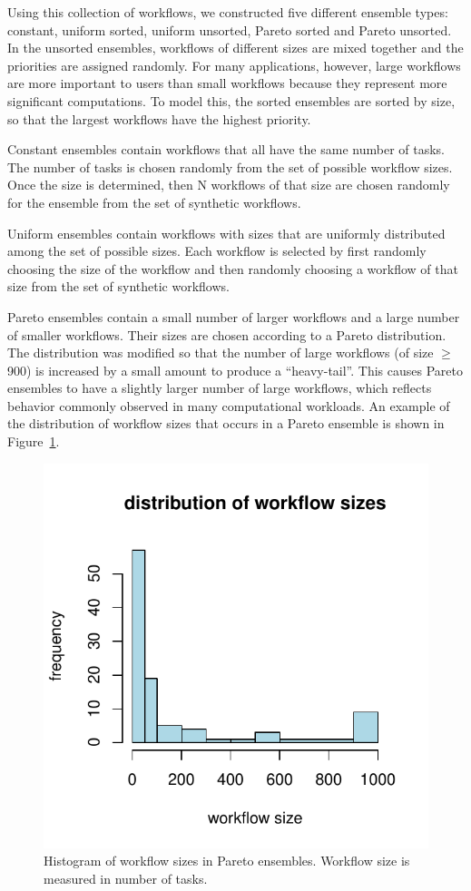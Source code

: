 \documentclass[preprint,5p]{elsarticle}
\begin{document}
Using this collection of workflows, we constructed five different ensemble types:
constant, uniform sorted, uniform unsorted, Pareto sorted and Pareto unsorted.
In the unsorted ensembles, workflows of different sizes are mixed together and
the priorities are assigned randomly.
For many applications, however, large workflows are
more important to users than small workflows because they represent more
significant computations. To model this, the sorted ensembles are sorted by
size, so that the largest workflows have the highest priority.

Constant ensembles contain workflows that all have the same number of tasks. 
The number of tasks is chosen randomly from the set of
possible workflow sizes. Once the size is determined, then N workflows of that
size are chosen randomly for the ensemble from the set of synthetic workflows.

Uniform ensembles contain workflows with sizes that are uniformly distributed
among the set of possible sizes. Each workflow 
is selected by first randomly choosing the size of the workflow
and then randomly choosing a workflow of that size from the set of
synthetic workflows.

Pareto ensembles contain a small number of larger workflows and a large number
of smaller workflows. Their sizes  
are chosen according to a Pareto distribution. The distribution was modified so
that the number of large workflows (of size $\geq$ 900) is increased by a small amount to
produce a ``heavy-tail''. This causes Pareto ensembles to have a slightly larger
number of large workflows, which reflects behavior commonly observed in many
computational workloads. 
An example of the distribution of workflow sizes that
occurs in a Pareto ensemble is shown in Figure~\ref{fig:ensemble-pareto}.

\begin{figure}[t] 
    \centering
    \includegraphics[width=0.6\columnwidth]{figures/ensemble-pareto}
    \caption[Histogram of workflow sizes in Pareto ensembles]{Histogram of
    workflow sizes in Pareto ensembles. Workflow size is measured in number of
    tasks.}
    \label{fig:ensemble-pareto}
\end{figure}
\end{document}
